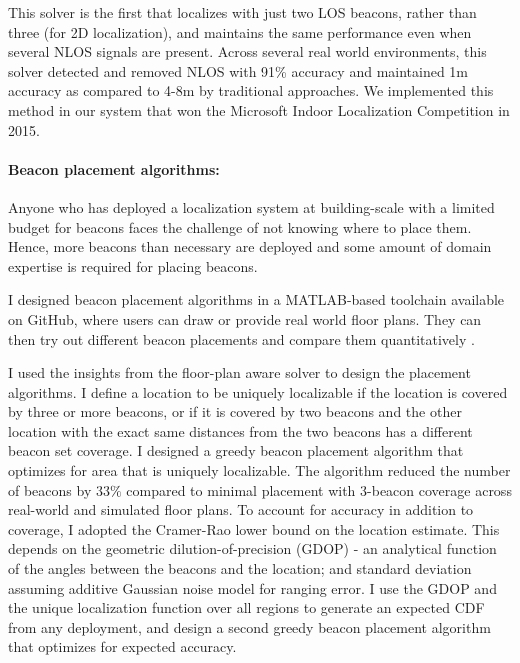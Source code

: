 \documentclass[10pt]{article}
\begin{document}
This solver is the first that localizes with just two LOS beacons, rather than three (for 2D localization), and maintains the same performance even when several NLOS signals are present. Across several real
world environments, this solver detected and removed NLOS with 91\% accuracy and maintained 1m accuracy as compared to 4-8m by traditional approaches. We implemented this
method in our system that won the Microsoft Indoor
Localization Competition in 2015. 

\paragraph{Beacon placement algorithms: }
Anyone who has deployed a localization system at building-scale with a limited budget for beacons faces the challenge of not knowing where to place them. %
Hence, more beacons than necessary are deployed and some amount of domain expertise is required for placing beacons. 

I designed beacon placement algorithms in a
MATLAB-based toolchain available on GitHub, where users can draw or provide real world floor plans. They can
then try out different beacon placements and compare them quantitatively \cite{rajagopal2016beacon}. 

I used the insights from the floor-plan aware solver to design the placement algorithms. 
I define a location to be uniquely localizable if the location is covered by three or more beacons, or if it is covered by two beacons and the other location with the exact same distances from the two beacons has a different beacon set coverage. I designed a greedy beacon placement algorithm that optimizes for area that is uniquely localizable.  The algorithm reduced the number of beacons by $33\%$ compared to minimal placement with 3-beacon coverage across real-world and simulated floor plans. 
To account for accuracy in addition to coverage, I adopted the Cramer-Rao lower bound on the location estimate. This depends on the geometric dilution-of-precision (GDOP) - an analytical function of the angles between the beacons and the location; and standard deviation assuming additive Gaussian noise model for ranging error. I use the GDOP and the unique localization function over all regions to generate an expected CDF from any deployment, and design a second greedy beacon placement algorithm that optimizes for expected accuracy.  
\end{document}
